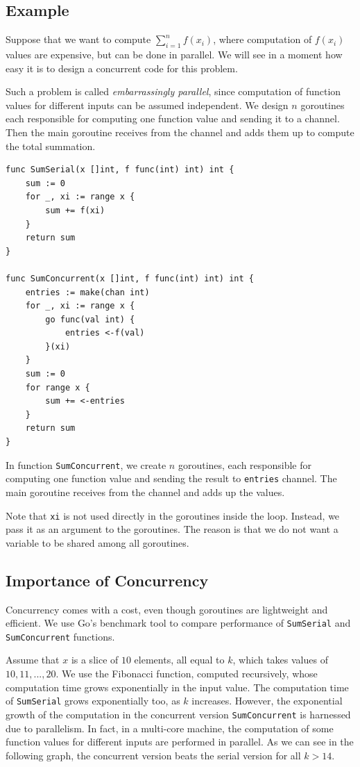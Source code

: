 \documentclass[11pt]{article}
\begin{document}
\subsection{Example}
\label{sec:orgheadline4}
Suppose that we want to compute \(\sum_{i=1}^nf(x_i)\), where computation of \(f(x_i)\) values are expensive, but can be done in parallel. We will see in a moment how easy it is to design a concurrent code for this problem.

Such a problem is called \emph{embarrassingly parallel}, since computation of function values for different inputs can be assumed independent. We design \(n\) goroutines each responsible for computing one function value and sending it to a channel. Then the main goroutine receives from the channel and adds them up to compute the total summation.

\begin{verbatim}
func SumSerial(x []int, f func(int) int) int {
    sum := 0
    for _, xi := range x {
        sum += f(xi)
    }
    return sum
}

func SumConcurrent(x []int, f func(int) int) int {
    entries := make(chan int)
    for _, xi := range x {
        go func(val int) {
            entries <-f(val)
        }(xi)
    }
    sum := 0
    for range x {
        sum += <-entries
    }
    return sum
}
\end{verbatim}
In function \texttt{SumConcurrent}, we create \(n\) goroutines, each responsible for computing one function value and sending the result to \texttt{entries} channel. The main goroutine receives from the channel and adds up the values.

Note that \texttt{xi} is not used directly in the goroutines inside the loop. Instead, we pass it as an argument to the goroutines. The reason is that we do not want a variable to be shared among all goroutines.

\subsection{Importance of Concurrency}
\label{sec:orgheadline5}
Concurrency comes with a cost, even though goroutines are lightweight and efficient. We use Go's benchmark tool to compare performance of \texttt{SumSerial} and \texttt{SumConcurrent} functions.

Assume that \(x\) is a slice of \(10\) elements, all equal to \(k\), which takes values of \(10,11,...,20\). We use the Fibonacci function, computed recursively, whose computation time grows exponentially in the input value. The computation time of \texttt{SumSerial} grows exponentially too, as \(k\) increases. However, the exponential growth of the computation in the concurrent version \texttt{SumConcurrent} is harnessed due to parallelism. In fact, in a multi-core machine, the computation of some function values for different inputs are performed in parallel. As we can see in the following graph, the concurrent version beats the serial version for all \(k > 14\).
\end{document}
